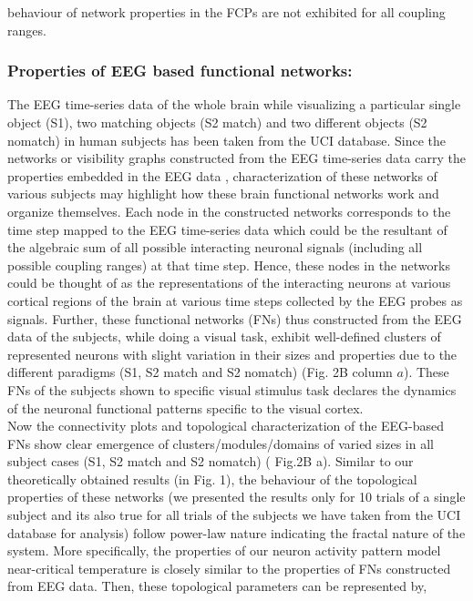 \documentclass[preprintnumbers,amsmath,amssymb,onecolumn]{revtex4}
\begin{document}
behaviour of network properties in the FCPs are not exhibited for all coupling ranges.\\

\subsubsection{Properties of EEG based functional networks:}

{\noindent}The EEG time-series data of the whole brain while visualizing a particular single object (S1), two matching objects (S2 match) and two different objects (S2 nomatch) in human subjects has been taken from the UCI database. Since the networks or visibility graphs constructed from the EEG time-series data carry the properties embedded in the EEG data \citep{Lacasa2008}, characterization of these networks of various subjects may highlight how these brain functional networks work and organize themselves. Each node in the constructed networks corresponds to the time step mapped to the EEG time-series data which could be the resultant of the algebraic sum of all possible interacting neuronal signals (including all possible coupling ranges) at that time step. Hence, these nodes in the networks could be thought of as the representations of the interacting neurons at various cortical regions of the brain at various time steps collected by the EEG probes as signals. Further, these functional networks (FNs) thus constructed from the EEG data of the subjects, while doing a visual task, exhibit well-defined clusters of represented neurons with slight variation in their sizes and properties due to the different paradigms (S1, S2 match and S2 nomatch) (Fig. 2B column $a$). These FNs of the subjects shown to specific visual stimulus task declares the dynamics of the neuronal functional patterns specific to the visual cortex.\\

{\noindent}Now the connectivity plots and topological characterization of the EEG-based FNs show clear emergence of clusters/modules/domains of varied sizes in all subject cases (S1, S2 match and S2 nomatch) ( Fig.2B a). Similar to our theoretically obtained results (in Fig. 1), the behaviour of the topological properties of these networks (we presented the results only for 10 trials of a single subject and its also true for all trials of the subjects we have taken from the UCI database for analysis) follow power-law nature indicating the fractal nature of the system. More specifically, the properties of our neuron activity pattern model near-critical temperature is closely similar to the properties of FNs constructed from EEG data. Then, these topological parameters can be represented by,
\end{document}
